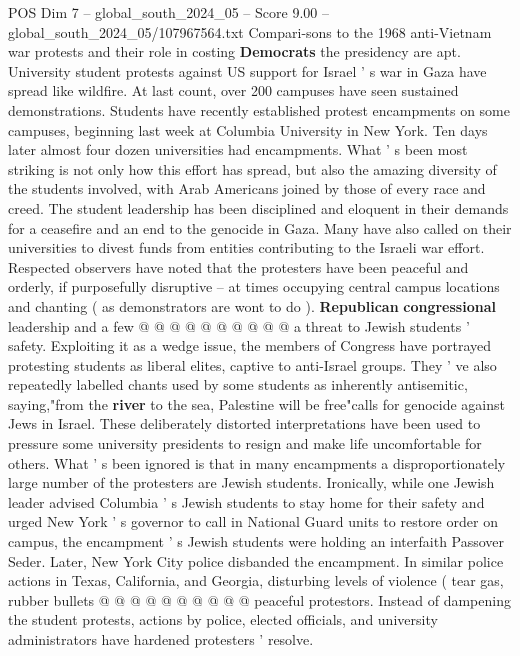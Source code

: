 \begin{textsample}{POS Dim 7 – global\_south\_2024\_05 – Score 9.00 – global\_south\_2024\_05/107967564.txt}  \label{ex:f7_pos_207}
Compari-sons to the 1968 anti-Vietnam war protests and their role in costing \textbf{Democrats} the presidency are apt.
University student protests against US support for Israel ' s war in Gaza have spread like wildfire.
At last count, over 200 campuses have seen sustained demonstrations.
Students have recently established protest encampments on some campuses, beginning last week at Columbia University in New York.
Ten days later almost four dozen universities had encampments.
What ' s been most striking is not only how this effort has spread, but also the amazing diversity of the students involved, with Arab Americans joined by those of every race and creed.
The student leadership has been disciplined and eloquent in their demands for a ceasefire and an end to the genocide in Gaza.
Many have also called on their universities to divest funds from entities contributing to the Israeli war effort.
Respected observers have noted that the protesters have been peaceful and orderly, if purposefully disruptive -- at times occupying central campus locations and chanting ( as demonstrators are wont to do ). \textbf{Republican} \textbf{congressional} leadership and a few @ @ @ @ @ @ @ @ @ @ a threat to Jewish students ' safety.
Exploiting it as a wedge issue, the members of Congress have portrayed protesting students as liberal elites, captive to anti-Israel groups.
They ' ve also repeatedly labelled chants used by some students as inherently antisemitic, saying,"from the \textbf{river} to the sea, Palestine will be free"calls for genocide against Jews in Israel.
These deliberately distorted interpretations have been used to pressure some university presidents to resign and make life uncomfortable for others.
What ' s been ignored is that in many encampments a disproportionately large number of the protesters are Jewish students.
Ironically, while one Jewish leader advised Columbia ' s Jewish students to stay home for their safety and urged New York ' s governor to call in National Guard units to restore order on campus, the encampment ' s Jewish students were holding an interfaith Passover Seder.
Later, New York City police disbanded the encampment.
In similar police actions in Texas, California, and Georgia, disturbing levels of violence ( tear gas, rubber bullets @ @ @ @ @ @ @ @ @ @ peaceful protestors.
Instead of dampening the student protests, actions by police, elected officials, and university administrators have hardened protesters ' resolve.

\end{textsample}
